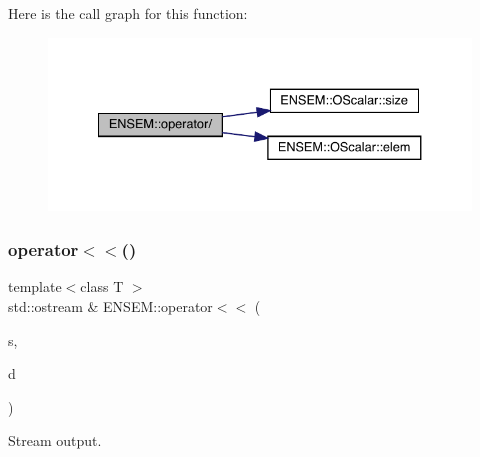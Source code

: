 Here is the call graph for this function\+:\nopagebreak
\begin{figure}[H]
\begin{center}
\leavevmode
\includegraphics[width=334pt]{da/d59/group__obsvector_gaf4f1f6a048cad788e11294a211380fab_cgraph}
\end{center}
\end{figure}
\mbox{\label{group__obsvector_ga9f3b52a0bbdae09acbfdfc9471404f5d}} 
\subsubsection{\texorpdfstring{operator$<$$<$()}{operator<<()}\hspace{0.1cm}{\footnotesize\ttfamily [1/3]}}
{\footnotesize\ttfamily template$<$class T $>$ \\
std\+::ostream \& E\+N\+S\+E\+M\+::operator$<$$<$ (\begin{DoxyParamCaption}\item[{std\+::ostream \&}]{s,  }\item[{const \mbox{\hyperlink{classENSEM_1_1OVector}{O\+Vector}}$<$ T $>$ \&}]{d }\end{DoxyParamCaption})\hspace{0.3cm}{\ttfamily [inline]}}



Stream output. 

\mbox{\label{group__obsvector_gab5665d6ff814904bdb812d03f102731a}} 
